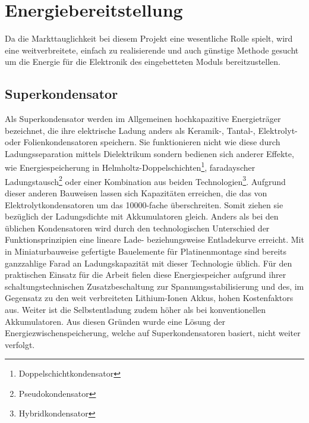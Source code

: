 \documentclass[12pt]{scrreprt} %
\begin{document}
\section{Energiebereitstellung}
\label{chap:4.2}
Da die Markttauglichkeit bei diesem Projekt eine wesentliche Rolle spielt, wird eine weitverbreitete, einfach zu realisierende und auch günstige Methode gesucht um die Energie für die Elektronik des eingebetteten Moduls bereitzustellen.
\subsection{Superkondensator}
Als Superkondensator werden im Allgemeinen hochkapazitive Energieträger bezeichnet, die ihre elektrische Ladung anders als Keramik-, Tantal-, Elektrolyt- oder Folienkondensatoren speichern. Sie funktionieren nicht wie diese durch Ladungsseparation mittels Dielektrikum sondern bedienen sich anderer Effekte, wie Energiespeicherung in Helmholtz-Doppelschichten\footnote{Doppelschichtkondensator}, faradayscher Ladungstausch\footnote{Pseudokondensator} oder einer Kombination aus beiden Technologien\footnote{Hybridkondensator}. Aufgrund dieser anderen Bauweisen lassen sich Kapazitäten erreichen, die das von Elektrolytkondensatoren um das 10000-fache überschreiten. Somit ziehen sie bezüglich der Ladungsdichte mit Akkumulatoren gleich. Anders als bei den üblichen Kondensatoren wird durch den technologischen Unterschied der Funktionsprinzipien eine lineare Lade- beziehungsweise Entladekurve erreicht. Mit in Miniaturbauweise gefertigte Bauelemente für Platinenmontage sind bereits ganzzahlige Farad an Ladungskapazität mit dieser Technologie üblich. Für den praktischen Einsatz für die Arbeit fielen diese Energiespeicher aufgrund ihrer schaltungstechnischen Zusatzbeschaltung zur Spannungsstabilisierung und des, im Gegensatz zu den weit verbreiteten Lithium-Ionen Akkus, hohen Kostenfaktors aus. Weiter ist die Selbstentladung zudem höher als bei konventionellen Akkumulatoren. Aus diesen Gründen wurde eine Lösung der Energiezwischenspeicherung, welche auf Superkondensatoren basiert, nicht weiter verfolgt.
\end{document}
